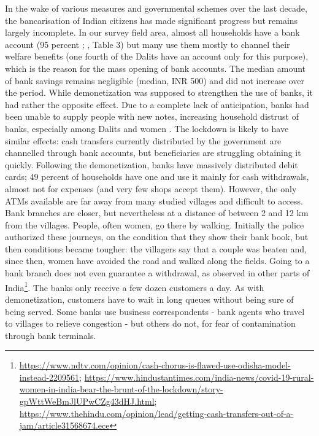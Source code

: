 \documentclass[a4paper, 11pt, onecolumn]{article}
\begin{document}
In the wake of various measures and governmental schemes over the last decade, the bancarisation of Indian citizens has made significant progress but remains largely incomplete. In our survey field area, almost all households have a bank account (95 percent ; \cite{Guerin2017}, Table 3) but many use them mostly to channel their welfare benefits (one fourth of the Dalits have an account only for this purpose), which is the reason for the mass opening of bank accounts. The median amount of bank savings remains negligible (median, INR 500) and did not increase over the period. While demonetization was supposed to strengthen the use of banks, it had rather the opposite effect. Due to a complete lack of anticipation, banks had been unable to supply people with new notes, increasing household distrust of banks, especially among Dalits and women \citep{Guerin2017}. The lockdown is likely to have similar effects: cash transfers currently distributed by the government are channelled through bank accounts, but beneficiaries are struggling obtaining it quickly. Following the demonetization, banks have massively distributed debit cards; 49 percent of households have one and use it mainly for cash withdrawals, almost not for expenses (and very few shops accept them). However, the only ATMs available are far away from many studied villages and difficult to access. Bank branches are closer, but nevertheless at a distance of between 2 and 12 km from the villages. People, often women, go there by walking. Initially the police authorized these journeys, on the condition that they show their bank book, but then conditions became tougher: the villagers say that a couple was beaten and, since then, women have avoided the road and walked along the fields. Going to a bank branch does not even guarantee a withdrawal, as observed in other parts of India\footnote{\url{https://www.ndtv.com/opinion/cash-chorus-is-flawed-use-odisha-model-instead-2209561}; \url{https://www.hindustantimes.com/india-news/covid-19-rural-women-in-india-bear-the-brunt-of-the-lockdown/story-gpWttWeBmJlUPwCZg43dHJ.html}; \url{https://www.thehindu.com/opinion/lead/getting-cash-transfers-out-of-a-jam/article31568674.ece}}. 
The banks only receive a few dozen customers a day. As with demonetization, customers have to wait in long queues without being sure of being served. Some banks use business correspondents - bank agents who travel to villages to relieve congestion - but others do not, for fear of contamination through bank terminals. 
\end{document}
